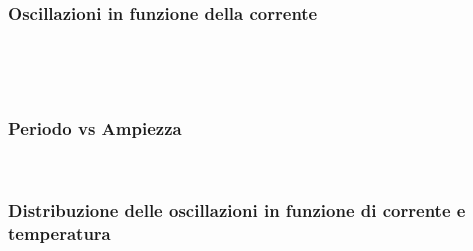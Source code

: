 \documentclass[11pt]{article}
\begin{document}
    \hypertarget{oscillazioni-in-funzione-della-corrente}{%
\subsubsection{Oscillazioni in funzione della
corrente}\label{oscillazioni-in-funzione-della-corrente}}


    \begin{center}
    \end{center}
    { \hspace*{\fill} \\}
    
    \begin{center}
    \end{center}
    { \hspace*{\fill} \\}
    
    \hypertarget{periodo-vs-ampiezza}{%
\subsubsection{Periodo vs Ampiezza}\label{periodo-vs-ampiezza}}


    \begin{center}
    \end{center}
    { \hspace*{\fill} \\}
    
    \hypertarget{distribuzione-delle-oscillazioni-in-funzione-di-corrente-e-temperatura}{%
\subsubsection{Distribuzione delle oscillazioni in funzione di corrente
e
temperatura}\label{distribuzione-delle-oscillazioni-in-funzione-di-corrente-e-temperatura}}



    \begin{center}
    \end{center}
    { \hspace*{\fill} \\}
    
    \begin{center}
    \end{center}
    { \hspace*{\fill} \\}
    
\end{document}
